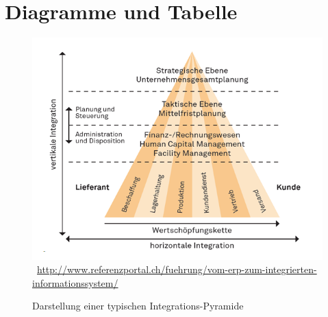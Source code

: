 \chapter{Diagramme und Tabelle}
\label{chap:anhang_a}
\begin{figure}[htb]
    \centering 
    \includegraphics[width=\linewidth]{content/images/integrations-pyramide}\
    \quelle\url{http://www.referenzportal.ch/fuehrung/vom-erp-zum-integrierten-informationssystem/}
    \caption[Darstellung einer typischen Integrations-Pyramide]{Darstellung einer typischen Integrations-Pyramide\\}
    \label{fig:integrations-pyramide} 
\end{figure} 